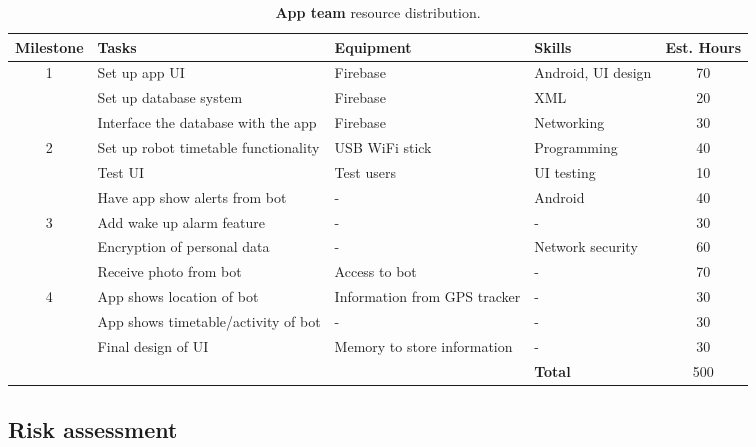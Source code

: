 \documentclass{article}
\begin{document}
\begin{table*}[]
  \begin{center}
  \begin{small}
  \begin{tabular}{|c|l|l|l|c|}
    \hline
    {\bf Milestone} & {\bf Tasks} & {\bf Equipment} & {\bf Skills} & {\bf Est. Hours} \\ \hline
    1               & Set up app UI & Firebase & Android, UI design & 70 \\ \cline{2-5}
                    & Set up database system & Firebase & XML & 20 \\ \cline{2-5}
                    & Interface the database with the app & Firebase & Networking & 30 \\ \hline
    2               & Set up robot timetable functionality & USB WiFi stick & Programming & 40 \\ \cline{2-5}
                    & Test UI & Test users & UI testing & 10 \\ \cline{2-5}
                    & Have app show alerts from bot & - & Android & 40 \\ \hline
    3               & Add wake up alarm feature & - & - & 30 \\ \cline{2-5}
                    & Encryption of personal data & - & Network security & 60 \\ \cline{2-5}
                    & Receive photo from bot & Access to bot & - & 70 \\ \hline
    4               & App shows location of bot & Information from GPS tracker & - & 30 \\ \cline{2-5}
                    & App shows timetable/activity of bot & - & - & 30 \\ \cline{2-5}
                    & Final design of UI & Memory to store information & - & 30 \\ \hline
                    &                           &  & {\bf Total} & 500 \\ \hline
  \end{tabular}
  \end{small}
  \caption{{\bf App team} resource distribution.}
  \label{tab:app-rd}
  \end{center}
\end{table*}


\subsection{Risk assessment} 
\end{document}

